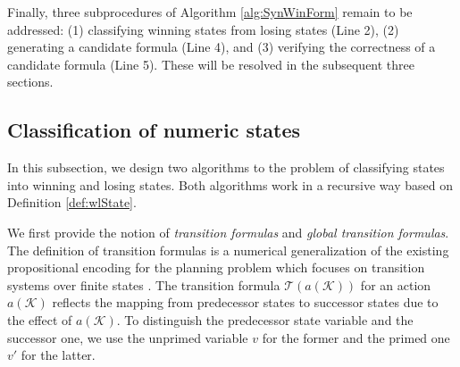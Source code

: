 \documentclass[review]{elsarticle}
\newcommand{\actparm}{\mathcal{K}}
\newcommand{\trans}{\mathcal{T}}
\begin{document}
        Finally, three  subprocedures of Algorithm \ref{alg:SynWinForm} remain to be addressed: 
        (1) classifying winning states from losing states (Line 2),
        (2) generating a candidate formula (Line 4), and 
        (3) verifying the correctness of a candidate formula (Line 5).
        These will be resolved in the subsequent three sections.
        
    \subsection{Classification of numeric states}
    In this subsection, we design two algorithms to the problem of classifying states into winning and losing states.
    Both algorithms work in a recursive way based on Definition \ref{def:wlState}.
    

    We first provide the notion of \textit{transition formulas} and \textit{global transition formulas}.
    The definition of transition formulas is a numerical generalization of the existing propositional encoding for the planning problem which focuses on transition systems over finite states \cite{HofB2006,Rin2012}.
    The transition formula $\trans(a(\actparm))$ for an action $a(\actparm)$ reflects the mapping from predecessor states to successor states due to the effect of $a(\actparm)$.
    To distinguish the predecessor state variable and the successor one, we use the unprimed variable $v$ for the former and the primed one $v'$ for the latter.
    
\end{document}
